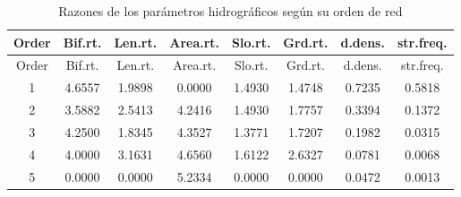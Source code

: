 \documentclass[11pt,]{article}
\begin{document}
\begin{longtable}[]{@{}cccccccc@{}}
\caption{\label{razones} Razones de los parámetros hidrográficos según
su orden de red}\tabularnewline
\toprule
Order & Bif.rt. & Len.rt. & Area.rt. & Slo.rt. & Grd.rt. & d.dens. &
str.freq.\tabularnewline
\midrule
\endfirsthead
\toprule
Order & Bif.rt. & Len.rt. & Area.rt. & Slo.rt. & Grd.rt. & d.dens. &
str.freq.\tabularnewline
\midrule
\endhead
1 & 4.6557 & 1.9898 & 0.0000 & 1.4930 & 1.4748 & 0.7235 &
0.5818\tabularnewline
2 & 3.5882 & 2.5413 & 4.2416 & 1.4930 & 1.7757 & 0.3394 &
0.1372\tabularnewline
3 & 4.2500 & 1.8345 & 4.3527 & 1.3771 & 1.7207 & 0.1982 &
0.0315\tabularnewline
4 & 4.0000 & 3.1631 & 4.6560 & 1.6122 & 2.6327 & 0.0781 &
0.0068\tabularnewline
5 & 0.0000 & 0.0000 & 5.2334 & 0.0000 & 0.0000 & 0.0472 &
0.0013\tabularnewline
\bottomrule
\end{longtable}
\end{document}
